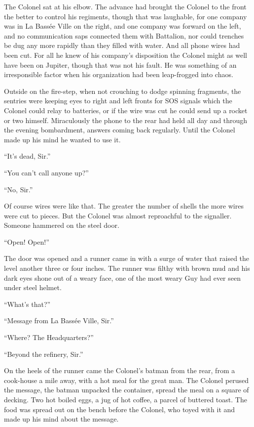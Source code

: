 The Colonel sat at his elbow. The advance had brought the Colonel to the front the better to control his regiments, though that was laughable, for one company was in La Bass\'{e}e Ville on the right, and one company was forward on the left, and no communication saps connected them with Battalion, nor could trenches be dug any more rapidly than they filled with water. And all phone wires had been cut. For all he knew of his company's disposition the Colonel might as well have been on Jupiter, though that was not his fault. He was something of an irresponsible factor when his organization had been leap-frogged into chaos.

Outside on the fire-step, when not crouching to dodge spinning fragments, the sentries were keeping eyes to right and left fronts for SOS signals which the Colonel could relay to batteries, or if the wire was cut he could send up a rocket or two himself. Miraculously the phone to the rear had held all day and through the evening bombardment, answers coming back regularly. Until the Colonel made up his mind he wanted to use it.

``It's dead, Sir.''

``You can't call anyone up?''

``No, Sir.''

Of course wires were like that. The greater the number of shells the more wires were cut to pieces. But the Colonel was almost reproachful to the signaller. Someone hammered on the steel door.

``Open! Open!''

The door was opened and a runner came in with a surge of water that raised the level another three or four inches. The runner was filthy with brown mud and his dark eyes shone out of a weary face, one of the most weary Guy had ever seen under steel helmet.

``What's that?''

``Message from La Bass\'{e}e Ville, Sir.''

``Where? The Headquarters?''

``Beyond the refinery, Sir.''

On the heels of the runner came the Colonel's batman from the rear, from a cook-house a mile away, with a hot meal for the great man. The Colonel perused the message, the batman unpacked the container, spread the meal on a square of decking. Two hot boiled eggs, a jug of hot coffee, a parcel of buttered toast. The food was spread out on the bench before the Colonel, who toyed with it and made up his mind about the message.

